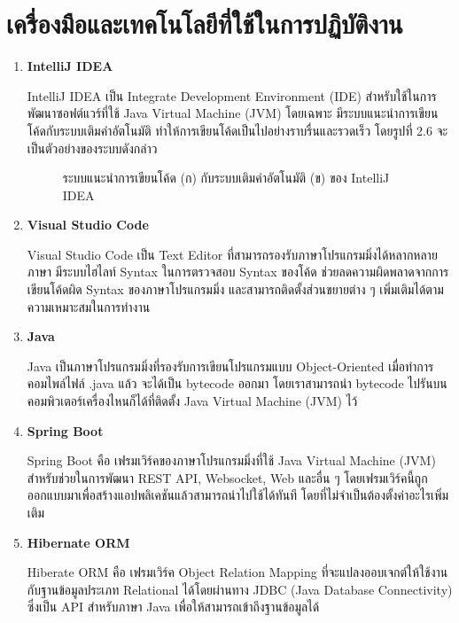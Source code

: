 \section{เครื่องมือและเทคโนโลยีที่ใช้ในการปฏิบัติงาน}
\begin{enumerate}
	\item \textbf{IntelliJ IDEA}
	
	IntelliJ IDEA เป็น Integrate Development Environment (IDE) สำหรับใช้ในการพัฒนาซอฟต์แวร์ที่ใช้ Java Virtual Machine (JVM) โดยเฉพาะ มีระบบแนะนำการเขียนโค้ดกับระบบเติมคำอัตโนมัติ ทำให้การเขียนโค้ดเป็นไปอย่างราบรื่นและรวดเร็ว โดยรูปที่ 2.6 จะเป็นตัวอย่างของระบบดังกล่าว ~\cite{intellij}
	
	\begin{figure}[!h]
		\centering
		\caption{ระบบแนะนำการเขียนโค้ด (ก) กับระบบเติมคำอัตโนมัติ (ข) ของ IntelliJ IDEA}
		\label{Fig:intellij}
	\end{figure}
	
	\item \textbf{Visual Studio Code}
	
	Visual Studio Code เป็น Text Editor ที่สามารถรองรับภาษาโปรแกรมมิ่งได้หลากหลายภาษา มีระบบไฮไลท์ Syntax ในการตรวจสอบ Syntax ของโค้ด ช่วยลดความผิดพลาดจากการเขียนโค้ดผิด Syntax ของภาษาโปรแกรมมิ่ง และสามารถติดตั้งส่วนขยายต่าง ๆ  เพิ่มเติมได้ตามความเหมาะสมในการทำงาน ~\cite{vscode}
	
	\item \textbf{Java}
	
	Java เป็นภาษาโปรแกรมมิ่งที่รองรับการเขียนโปรแกรมแบบ Object-Oriented เมื่อทำการคอมไพล์ไฟล์ .java แล้ว จะได้เป็น bytecode ออกมา โดยเราสามารถนำ bytecode ไปรันบนคอมพิวเตอร์เครื่องไหนก็ได้ที่ติดตั้ง Java Virtual Machine (JVM) ไว้ ~\cite{java}
	
	\item \textbf{Spring Boot}
	
	Spring Boot คือ เฟรมเวิร์คของภาษาโปรแกรมมิ่งที่ใช้ Java Virtual Machine (JVM) สำหรับช่วยในการพัฒนา REST API, Websocket, Web และอื่น ๆ โดยเฟรมเวิร์คนี้ถูกออกแบบมาเพื่อสร้างแอปพลิเคชันแล้วสามารถนำไปใช้ได้ทันที โดยที่ไม่จำเป็นต้องตั้งค่าอะไรเพิ่มเติม ~\cite{spring}
	
	\item \textbf{Hibernate ORM}
	
	Hiberate ORM คือ เฟรมเวิร์ค Object Relation Mapping ที่จะแปลงออบเจกต์ให้ใช้งานกับฐานข้อมูลประเภท Relational ได้โดยผ่านทาง JDBC (Java Database Connectivity) ซึ่งเป็น API สำหรับภาษา Java เพื่อให้สามารถเข้าถึงฐานข้อมูลได้ ~\cite{hibernate}


\end{enumerate}
